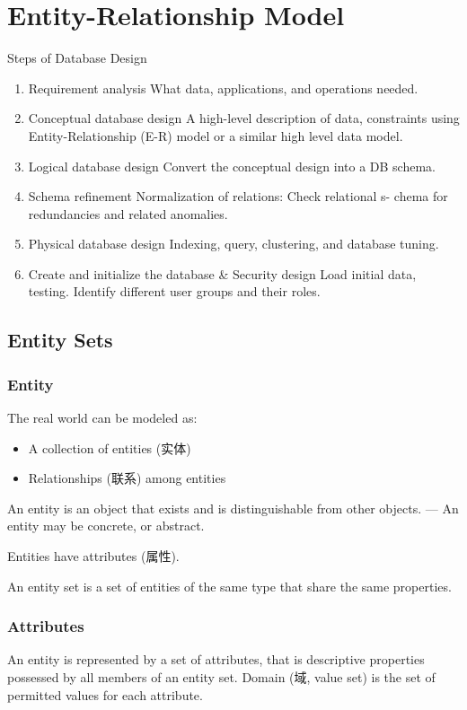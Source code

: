 \newpage
\section{Entity-Relationship Model}
Steps of Database Design
\begin{enumerate}\small
    \item Requirement analysis
    \subitem What data, applications, and operations needed.
    \item Conceptual database design
    \subitem A high-level description of data, constraints using\\ Entity-Relationship (E-R) model
    or a similar high level data model.
    \item Logical database design
    \subitem Convert the conceptual design into a DB schema.
    \item Schema refinement
    \subitem Normalization of relations: Check relational s- chema for redundancies and related
    anomalies.
    \item Physical database design
    \subitem Indexing, query, clustering, and database tuning.
    \item Create and initialize the database \& Security design
    \subitem Load initial data, testing.
    \subitem Identify different user groups and their roles.
\end{enumerate}

\subsection{Entity Sets}
\subsubsection{Entity}
The real world can be modeled as:
\begin{itemize}\small
    \item A collection of entities (实体)
    \item Relationships (联系) among entities
\end{itemize}

An entity is an object that exists and is distinguishable from other objects. --- An entity may be concrete, or abstract.

Entities have attributes (属性). 

An entity set is a set of entities of the same type that share the same properties.

\subsubsection{Attributes}
An entity is represented by a set of attributes, that is descriptive properties possessed by all members of an entity set. Domain (域, value set) is the set of permitted values for each attribute.

